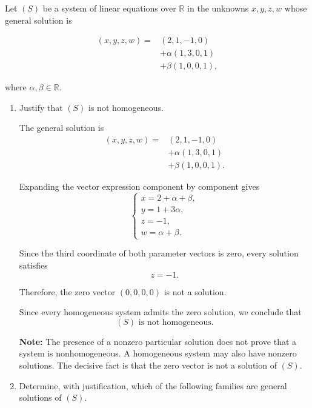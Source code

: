 \item Let $(S)$ be a system of linear equations over $\mathbb{R}$ in the unknowns $x,y,z,w$
whose general solution is

$$
\begin{aligned}
(x,y,z,w)
={}&(2,1,-1,0)\\
&+\alpha(1,3,0,1)\\
&+\beta(1,0,0,1),
\end{aligned}
$$

where $\alpha,\beta\in\mathbb{R}$.

\begin{enumerate}[label=\alph*)]

\item Justify that $(S)$ is not homogeneous.

\begin{answer}
    The general solution is
    $$
    \begin{aligned}
    (x,y,z,w)
    ={}&(2,1,-1,0)\\
    &+\alpha(1,3,0,1)\\
    &+\beta(1,0,0,1).
    \end{aligned}
    $$

    Expanding the vector expression
    component by component gives
    $$
    \begin{cases}
    x=2+\alpha+\beta,\\
    y=1+3\alpha,\\
    z=-1,\\
    w=\alpha+\beta.
    \end{cases}
    $$

    Since the third coordinate of both parameter vectors is zero, every solution satisfies
    $$
    z=-1.
    $$

    Therefore, the zero vector $(0,0,0,0)$ is not a solution.

    Since every homogeneous system admits the zero solution, we conclude that
    $$
    \boxed{(S)\text{ is not homogeneous}.}
    $$

    {\color{red}
    \textbf{Note:} The presence of a nonzero particular solution does not prove that
    a system is nonhomogeneous. A homogeneous system may also have nonzero
    solutions. The decisive fact is that the zero vector is not a solution of $(S)$.}
\end{answer}

\item Determine, with justification, which of the following families are
general solutions of $(S)$.


\end{enumerate}
